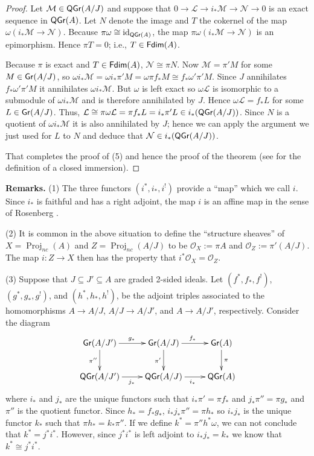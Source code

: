 \documentclass[10pt]{amsart}
\numberwithin{equation}{section}
\def\Fdim{{\sf Fdim}}
\def\Gr{{\sf Gr}}
\def\id{\operatorname{id}}
\def\Projnc{\operatorname{Proj}_{nc}}
\def\QGr{\operatorname{\sf QGr}}
\def\cL{{\mathcal L}}
\def\cM{{\mathcal M}}
\def\cN{{\mathcal N}}
\def\cO{{\mathcal O}}
\begin{document}
\begin{proof}
 
Let $\cM \in \QGr(A/J)$ and suppose that $0 \to \cL \to i_*\cM \to \cN
\to 0$ is an exact sequence in $\QGr(A)$. Let $N$ denote the image and $T$ the cokernel of the map $\omega( i_*\cM \to \cN)$.
Because $\pi\omega \cong \id_{\QGr(A)}$, the map $\pi \omega( i_*\cM \to \cN)$ is an epimorphism.
Hence $\pi T=0$; i.e., $T \in \Fdim(A)$.  

 Because $\pi$ is exact and $T \in \Fdim (A)$,    $\cN \cong \pi N$. 
Now $\cM=\pi' M$ for some $M \in \Gr (A/J)$, so 
$\omega i_* \cM = \omega i_* \pi' M = \omega \pi f_* M \cong 
f_*\omega'\pi' M$. Since $J$ annihilates $f_*\omega'\pi' M$ it annihilates $\omega i_* \cM$. 
But $\omega$ is left exact so $\omega \cL$ is isomorphic to a submodule of $\omega i_*\cM$ and is 
therefore annihilated by $J$. Hence $\omega\cL=f_*L$ for some $L \in \Gr (A/J)$.
Thus, $\cL \cong \pi\omega \cL = \pi f_*L = i_* \pi'L \in
i_*(\QGr(A/J))$. Since $N$ is a quotient of $\omega i_*\cM$ it is also annihilated by $J$; hence we can
apply the argument we just used for $L$ to $N$ and deduce that $\cN \in i_*(\QGr(A/J))$.

That completes the proof of (5) and hence the proof of the theorem (see 
\cite[p.2928]{S} for the definition of a closed immersion).  
\end{proof}

{\bf Remarks.}
(1)
The three functors $(i^*,i_*,i^!)$ provide a ``map''  which we call $i$.
Since $i_*$ is faithful and has a right adjoint, the map $i$ is an affine map in the sense of
Rosenberg \cite[p.278]{R}.  

(2)
It is common in the above situation to define the ``structure sheaves''   of $X=\Projnc(A)$
and $Z=\Projnc(A/J)$  to be $\cO_X:=\pi A$  and $\cO_Z:=\pi'(A/J)$.
The map $i:Z \to X$ then has the property that $i^*\cO_X =\cO_Z$.

(3)
Suppose that $J \subseteq J' \subseteq A$ are graded 2-sided ideals. Let $(f^*,f_*,f^!)$, $(g^*,g_*,g^!)$, and $(h^*,h_*,h^!)$, 
be the adjoint triples associated to the homomorphisms $A \to A/J$, $A/J \to A/J'$, and $A \to A/J'$, respectively.
Consider the diagram
$$
\xymatrix{
\Gr (A/J') \ar[r]^{g_*}  \ar[d]_{\pi''}  & \Gr (A/J) \ar[r]^{f_*}  \ar[d]_{\pi'}  & \Gr (A)  \ar[d]^{\pi}
\\
\QGr(A/J') \ar[r]_{j_*}  & \QGr(A/J) \ar[r]_{i_*}  &  \QGr(A)
}
$$
where $i_*$ and $j_*$ are the unique functors such that $i_*\pi'=\pi f_*$ and $j_*\pi'' = \pi g_*$ and $\pi''$ is the quotient
functor. Since $h_*=f_*g_*$, $i_*j_*\pi'' = \pi h_*$ so $i_*j_*$ is the unique functor $k_*$ such that $\pi h_*=k_*\pi''$.
If we define $k^*=\pi'' h^* \omega$, we can not conclude that $k^*=j^*i^*$. However, since $j^*i^*$ is left adjoint to $i_*j_*=k_*$ we know that $k^* \cong j^*i^*$. 
\end{document}
